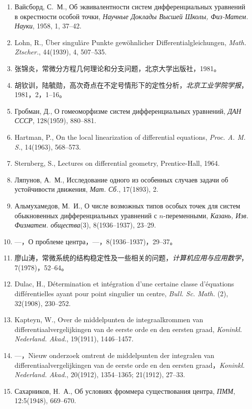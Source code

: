 \begin{enumerate}
\item Вайсборд, С.\ М., Об эквивалентности систем дифференциальных уравнений в окрестности особой точки, \textit{Научные Доклады Высшей Школы, Физ-Матем. Науки}, 1958, 1, 37--42.
\item Lohn, R., Über singuläre Punkte gewöhnlicher Differentialgleichungen, \textit{Math. Ztscher.}, 44(1939), 4, 507--535.
\item 张锦炎，常微分方程几何理论和分支问题，北京大学出版社，1981。
\item 胡钦训，陆毓勋，高次奇点在不定号情形下的定性分析，\textit{北京工业学院学报}，1981，2，1--16。
\item Гробман, Д., О гомеоморфизме систем дифференциальных уравнений, \textit{ДАН СССР}, 128(1959), 880--881.
\item Hartman, P., On the local linearization of differential equations, \textit{Proc. A. M. S.}, 14(1963), 568--573.
\item Sternberg, S., Lectures on differential geometry, Prentice-Hall, 1964.
\item Ляпунов, А.\ М., Исследование одного из особенных случаев задачи об устойчивости движения, \textit{Мат. Сб.}, 17(1893), 2.
\item Альмухамедов, М.\ И., О числе возможных типов особых точек для систем обыкновенных дифференциальных уравнений с $n$-переменными, \textit{Казань, Изв. Физматем. общества}(3), 8(1936--1937), 23--29.
\item ---，О проблеме центра，---，8(1936--1937)，29--37。
\item 廖山涛，常微系统的结构稳定性及一些相关的问题，\textit{计算机应用与应用数学}，7(1978)，52--64。
\item Dulac, H., Détermination et intégration d'une certaine classe d'équations différentielles ayant pour point singulier un centre, \textit{Bull. Sc. Math.} (2), 32(1908), 230--252.
\item Kapteyn, W., Over de middelpunten de integraalkrommen van differentiaalvergelijkingen van de eerste orde en den eersten graad, \textit{Koninkl. Nederland. Akad.}, 19(1911), 1446--1457.
\item ---，Nieuw onderzoek omtrent de middelpunten der integralen van differentiaalvergelijkingen van de eerste orde en den eersten graad，\textit{Koninkl. Nederland. Akad.}, 20(1912), 1354--1365; 21(1912), 27--33.
\item Сахарников, Н.\ А., Об условиях фроммера существования центра, \textit{ПММ}, 12:5(1948), 669--670.

\end{enumerate}
